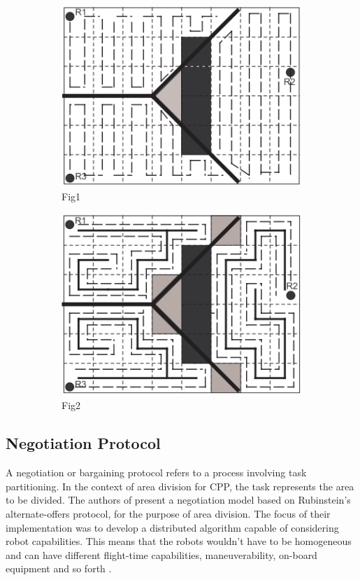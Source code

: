 \begin{figure}[h!]
	\centering
	\begin{subfigure}[b]{0.45\textwidth}
		\centering
		\includegraphics[scale=0.4]{figs/Voronoi_Euclid_BCD}
		\caption{Fig1}
		\label{fig:Voronoi - EuclidBCD}
	\end{subfigure}
	\hfill
	\begin{subfigure}[b]{0.45\textwidth}
		\centering
		\includegraphics[scale=0.4]{figs/Voronoi_Euclid_STC}
		\caption{Fig2}
		\label{fig:Voronoi - EuclidSTC}
	\end{subfigure}
\caption{}
\end{figure}

\subsection{Negotiation Protocol}
A negotiation or bargaining protocol refers to a process involving task partitioning. In the context of area division for CPP, the task represents the area to be divided\cite{Rossi2009}. The authors of \cite{Rossi2009} present a negotiation model based on Rubinstein's alternate-offers protocol, for the purpose of area division. The focus of their implementation was to develop a distributed algorithm capable of considering robot capabilities. This means that the robots wouldn't have to be homogeneous and can have different flight-time capabilities, maneuverability, on-board equipment and so forth \cite{Barrientos2011}. 

